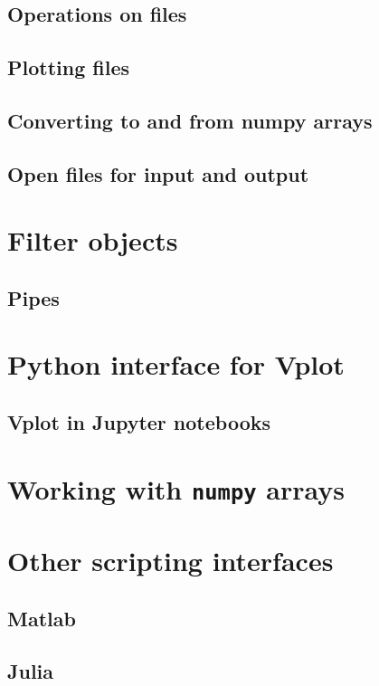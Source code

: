 \subsection{Operations on files}

\subsection{Plotting files}

\subsection{Converting to and from numpy arrays}

\subsection{Open files for input and output}

\section{Filter objects}

\subsection{Pipes}

\section{Python interface for Vplot}

\subsection{Vplot in Jupyter notebooks}

\section{Working with \texttt{numpy} arrays}

\section{Other scripting interfaces}

\subsection{Matlab}

\subsection{Julia}
